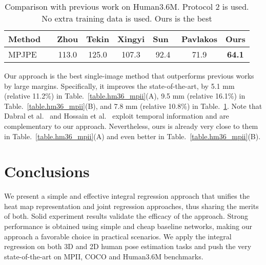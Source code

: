 \documentclass[runningheads]{llncs}
\begin{document}
\begin{table}[t]
{{    \hfill
    \begin{minipage}[b]{1.0\hsize}\centering
        \caption{Comparison with previous work on Human3.6M. Protocol 2 is used. No extra training data is used. Ours is the best}
        \label{table.hm36_p2_only}
        \begin{tabular}{|l|c|c|c|c|c|c|c|}
        \hline
Method && Zhou\cite{zhou2016sparseness} &Tekin\cite{tekin2016direct}&Xingyi\cite{zhou2016deep}&Sun~\cite{sun2017compositional}&Pavlakos\cite{pavlakos2016coarse}&Ours\\
        \hline
        MPJPE& &113.0 &125.0  &107.3  & 92.4& 71.9 & \textbf{64.1}\\
        \hline
        \end{tabular}
    \end{minipage}\bigskip
}}
\end{table}



Our approach is the best single-image method that outperforms previous works by large margins. Specifically, it improves the state-of-the-art, by 5.1 mm (relative 11.2\%) in Table.~\ref{table.hm36_mpii}(A), 9.5 mm (relative 16.1\%) in Table.~\ref{table.hm36_mpii}(B), and 7.8 mm (relative 10.8\%) in Table.~\ref{table.hm36_p2_only}. Note that Dabral et al.~\cite{dabral2017structure} and Hossain et al.~\cite{hossain2017exploiting} exploit temporal information and are complementary to our approach. Nevertheless, ours is already very close to them in Table.~\ref{table.hm36_mpii}(A) and even better in Table.~\ref{table.hm36_mpii}(B).

\section{Conclusions}

We present a simple and effective integral regression approach that unifies the heat map representation and joint regression approaches, thus sharing the merits of both. Solid experiment results validate the efficacy of the approach. Strong performance is obtained using simple and cheap baseline networks, making our approach a favorable choice in practical scenarios. We apply the integral regression on both 3D and 2D human pose estimation tasks and push the very state-of-the-art on MPII, COCO and Human3.6M benchmarks.



\end{document}
